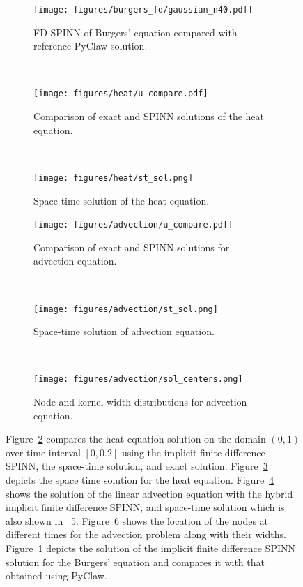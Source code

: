 \documentclass[12pt]{article}
\begin{document}
\begin{figure}
\begin{subfigure}{0.32\textwidth}
\texttt{[image: figures/burgers\_fd/gaussian\_n40.pdf]}
\caption{FD-SPINN of Burgers' equation compared with reference PyClaw solution.}
\label{fig:burgers_comp}
\end{subfigure}
~
\begin{subfigure}{0.32\textwidth}
\texttt{[image: figures/heat/u\_compare.pdf]}
\caption{Comparison of exact and SPINN solutions of the heat equation.}
\label{fig:heat_eqn_compare}
\end{subfigure}
~
\begin{subfigure}{0.32\textwidth}
\texttt{[image: figures/heat/st\_sol.png]}
\caption{Space-time solution of the heat equation.}
\label{fig:heat_eqn_st_sol}
\end{subfigure}

\begin{subfigure}{0.32\textwidth}
\texttt{[image: figures/advection/u\_compare.pdf]}
\caption{Comparison of exact and SPINN solutions for advection equation.}
\label{fig:advection_comp}
\end{subfigure}
~
\begin{subfigure}{0.32\textwidth}
\texttt{[image: figures/advection/st\_sol.png]}
\caption{Space-time solution of advection equation.}
\label{fig:advection_st}
\end{subfigure}
~
\begin{subfigure}{0.32\textwidth}
\texttt{[image: figures/advection/sol\_centers.png]}
\caption{Node and kernel width distributions for advection equation.}
\label{fig:advection_nodes}
\end{subfigure}
\caption{Figure~\ref{fig:heat_eqn_compare} compares the heat equation solution on the domain $(0,1)$ over time interval $[0, 0.2]$ using the implicit finite difference SPINN, the space-time solution, and exact solution. Figure~\ref{fig:heat_eqn_st_sol} depicts the space time solution for the heat equation.  Figure~\ref{fig:advection_comp} shows the solution of the linear advection equation with the hybrid implicit finite difference SPINN, and space-time solution which is also shown in ~\ref{fig:advection_st}.  Figure~\ref{fig:advection_nodes} shows the location of the nodes at different times for the advection problem along with their widths.
Figure~\ref{fig:burgers_comp} depicts the solution of the implicit finite difference SPINN solution for the Burgers' equation and compares it with that obtained using PyClaw.}
\label{fig:time_varying}
\end{figure}
\end{document}
